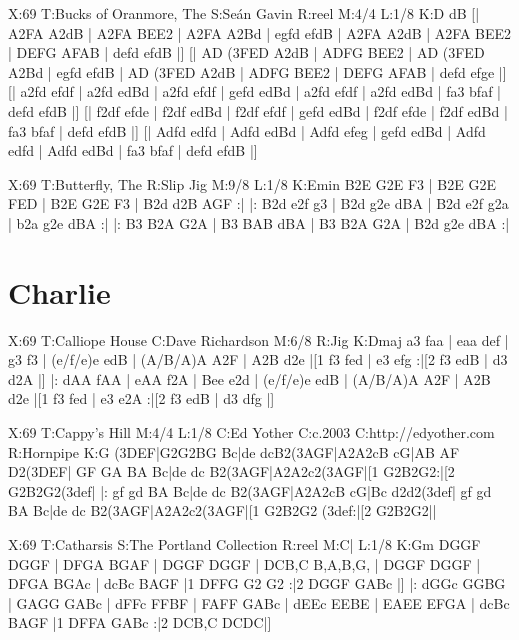 \documentclass[letterpaper]{article}
\begin{document}
\begin{abc}[name]
X:69
T:Bucks of Oranmore, The
S:Seán Gavin
R:reel
M:4/4
L:1/8
K:D
dB [| A2FA A2dB | A2FA BEE2 | A2FA A2Bd | egfd efdB |
A2FA A2dB | A2FA BEE2 | DEFG AFAB | defd efdB |]
[| AD (3FED A2dB | ADFG  BEE2 | AD (3FED A2Bd | egfd efdB |
AD (3FED A2dB | ADFG  BEE2 | DEFG AFAB | defd efge |]
[| a2fd efdf | a2fd edBd | a2fd efdf | gefd edBd |
a2fd efdf | a2fd edBd | fa3 bfaf | defd efdB |]
[| f2df efde | f2df edBd | f2df efdf | gefd edBd |
f2df efde | f2df edBd | fa3 bfaf | defd efdB |] 
[| Adfd edfd | Adfd edBd | Adfd efeg | gefd edBd |
Adfd edfd | Adfd edBd | fa3 bfaf | defd efdB |] 
\end{abc}

\begin{abc}[name]
X:69
T:Butterfly, The
R:Slip Jig
M:9/8
L:1/8
K:Emin
B2E G2E F3 | B2E G2E FED | B2E G2E F3 | B2d d2B AGF :|
|: B2d e2f g3 | B2d g2e dBA | B2d e2f g2a | b2a g2e dBA :|
|: B3 B2A G2A | B3 BAB dBA | B3 B2A G2A | B2d g2e dBA :|
\end{abc}

\section{Charlie}

\begin{abc}[name]
X:69
T:Calliope House
C:Dave Richardson
M:6/8
R:Jig
K:Dmaj
a3 faa | eaa def | g3 f3 | (e/f/e)e edB |
(A/B/A)A A2F | A2B d2e |[1 f3 fed | e3 efg :|[2 f3 edB | d3 d2A |]
|: dAA fAA | eAA f2A | Bee e2d | (e/f/e)e edB | (A/B/A)A A2F |
A2B d2e |[1 f3 fed | e3 e2A :|[2 f3 edB | d3 dfg |]
\end{abc}

\begin{abc}[name]
X:69
T:Cappy's Hill
M:4/4
L:1/8
C:Ed Yother
C:c.2003
C:http://edyother.com
R:Hornpipe
K:G
(3DEF|G2G2BG Bc|de dcB2(3AGF|A2A2cB cG|AB AF D2(3DEF|
GF GA BA Bc|de dc B2(3AGF|A2A2c2(3AGF|[1 G2B2G2:|[2 G2B2G2(3def|
|: gf gd BA Bc|de dc B2(3AGF|A2A2cB cG|Bc d2d2(3def|
gf gd BA Bc|de dc B2(3AGF|A2A2c2(3AGF|[1 G2B2G2 (3def:|[2 G2B2G2||
\end{abc}

\begin{abc}[name]
X:69
T:Catharsis
S:The Portland Collection
R:reel
M:C|
L:1/8
K:Gm
DGGF DGGF | DFGA BGAF | DGGF DGGF | DCB,C B,A,B,G, |
DGGF DGGF | DFGA BGAc | dcBc BAGF |1 DFFG G2 G2 :|2 DGGF GABc |]
|: dGGc GGBG | GAGG GABc | dFFc FFBF | FAFF GABc |
dEEc EEBE | EAEE EFGA | dcBc BAGF |1 DFFA GABc :|2 DCB,C DCDC|]
\end{abc}
\end{document}
